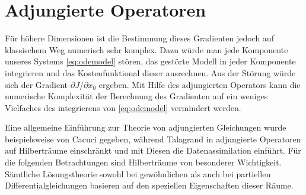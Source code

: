 \section{Adjungierte Operatoren}
Für höhere Dimensionen ist die Bestimmung dieses Gradienten jedoch auf klassischem Weg numerisch sehr komplex. Dazu würde man jede Komponente unseres Systems \eqref{eq:odemodel} stören, das gestörte Modell in jeder Komponente integrieren und das Kostenfunktional dieser ausrechnen. Aus der Störung würde sich der Gradient $\partial J/\partial x_0$ ergeben. Mit Hilfe des adjungierten Operators kann die numerische Komplexität der Berechnung des Gradienten auf ein weniges Vielfaches des integrierens von \eqref{eq:odemodel} vermindert werden.

Eine allgemeine Einführung zur Theorie von adjungierten Gleichungen wurde beispielsweise von Cacuci \cite{cacuci1981sensitivity} gegeben, während Talagrand in \cite{talagrand1987variational} adjungierte Operatoren auf Hilberträume einschränkt und mit Diesen die Datenassimilation einführt.
Für die folgenden Betrachtungen sind Hilberträume von besonderer Wichtigkeit. Sämtliche Lösungstheorie sowohl bei gewöhnlichen als auch bei partiellen Differentialgleichungen basieren auf den speziellen Eigenschaften dieser Räume.

